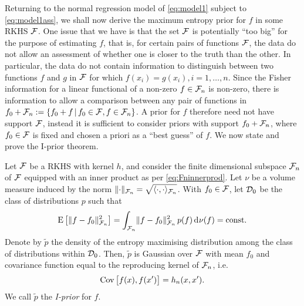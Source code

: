 Returning to the normal regression model of \cref{eq:model1} subject to \cref{eq:model1ass}, we shall now derive the maximum entropy prior for $f$ in some RKHS ${\mathcal F}$.
One issue that we have is that the set ${\mathcal F}$ is potentially ``too big'' for the purpose of estimating $f$, that is, for certain pairs of functions ${\mathcal F}$, the data do not allow an assessment of whether one is closer to the truth than the other.
In particular, the data do not contain information to distinguish between two functions $f$ and $g$ in ${\mathcal F}$ for which $f(x_i) = g(x_i), i=1,\dots,n$.
Since the Fisher information for a linear functional of a non-zero $f \in {\mathcal F}_n$ is non-zero, there is information to allow a comparison between any pair of functions in $f_0 + {\mathcal F}_n := \{f_0 + f \,|\, f_0 \in {\mathcal F}, f \in {\mathcal F}_n \}$.
A prior for $f$ therefore need not have support ${\mathcal F}$, instead it is sufficient to consider priors with support $f_0 + {\mathcal F}_n$, where $f_0 \in {\mathcal F}$ is fixed and chosen a priori as a ``best guess'' of $f$.
We now state and prove the I-prior theorem.

\begin{theorem}
  Let ${\mathcal F}$ be a RKHS with kernel $h$, and consider the finite dimensional subspace ${\mathcal F}_n$ of ${\mathcal F}$ equipped with an inner product as per \cref{eq:Fninnerprod}.
  Let $\nu$ be a volume measure induced by the norm $\lVert\cdot\rVert_{{\mathcal F}_n} = \sqrt{\langle\cdot,\cdot\rangle_{{\mathcal F}_n}}$.
  With $f_0 \in {\mathcal F}$, let ${\mathcal D}_0$ be the class of distributions $p$ such that 
  \[
    \operatorname{E}\big[\lVert f-f_0\rVert^2_{{\mathcal F}_n}\big] = \int_{{\mathcal F}_n} \lVert f-f_0\rVert^2_{{\mathcal F}_n} \, p(f) \operatorname{d}\hspace{0.5pt}\! \nu(f) = \text{const.}\hspace{0.01em}
  \]
  Denote by $\tilde p$ the density of the entropy maximising distribution among the class of distributions within ${\mathcal D}_0$.
  Then, $\tilde p$ is Gaussian over ${\mathcal F}$ with mean $f_0$ and covariance function equal to the reproducing kernel of ${\mathcal F}_n$, i.e.
  \[
    \operatorname{Cov}\big[f(x),f(x')\big] = h_n(x,x').
  \]
  We call $\tilde p$ the \emph{I-prior} for $f$.
\end{theorem}

